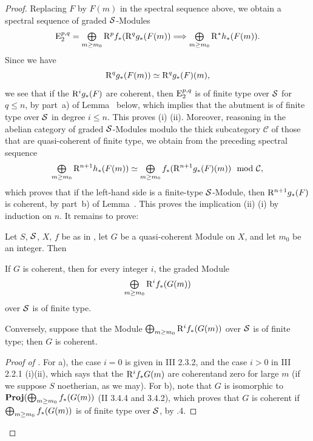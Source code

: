 \begin{proof}
Replacing $F$ by $F(m)$ in the spectral sequence above, we
obtain a spectral sequence of graded $\mathcal S$-Modules\pageoriginale
\[
\operatorname{E}_2^{p, q}= \mathop{\textstyle\bigoplus}\limits_{m\geq m_0} \mathrm R^pf_\ast(\mathrm R^qg_\ast(F(m)) \Longrightarrow \mathop{\textstyle\bigoplus}\limits_{m\geq m_0} \mathrm R^\ast h_\ast(F(m)).
\]
Since we have
\[
\mathrm R^qg_\ast(F(m)) \simeq \mathrm R^qg_\ast(F) (m),
\]
we see that if the $\mathrm R^ig_\ast(F)$ are coherent, then $\operatorname{E}_2^{p, q}$ is of finite type over $\mathcal S$ for $q\leq n$, by part~a) of Lemma~ below, which implies that the abutment is of finite type over $\mathcal S$ in degree $i\leq n$. This proves (i) \ALORS (ii). Moreover, reasoning in the abelian category of graded $\mathcal S$-Modules modulo the thick subcategory $\mathcal{C}$ of those that are quasi-coherent of finite type, we obtain from the preceding spectral sequence
\[
\mathop{\textstyle\bigoplus}\limits_{m\geq m_0} \mathrm R^{n+1} h_\ast(F(m)) \simeq \mathop{\textstyle\bigoplus}\limits_{m\geq m_0} f_\ast (\mathrm R^{n+1} g_\ast(F)(m)) \mod \mathcal{C},
\]
which proves that if the left-hand side is a finite-type $\mathcal S$-Module, then $\mathrm R^{n+1} g_\ast(F)$ is coherent, by part~b) of Lemma~. This proves the implication (ii) \ALORS (i) by induction on $n$. It remains to prove:

\begin{lemme} \label{XII.5.3} Let $S$, $\mathcal S$, $X$, $f$ be as in , let $G$ be a quasi-coherent Module on $X$, and let $m_0$ be an integer. Then
\begin{enumeratea}
\item
If $G$ is coherent, then for every integer $i$, the graded Module
\[
\mathop{\textstyle\bigoplus}\limits_{m\geq m_0} \mathrm R^i f_\ast(G(m))
\]
over $\mathcal S$ is of finite type.
\item
Conversely, suppose that the Module $\bigoplus_{m\geq m_0} \mathrm R^i f_\ast(G(m))$ over $\mathcal S$ is of finite type; then $G$ is coherent.
\end{enumeratea}
\end{lemme}

\begin{proof}[Proof of ]
For a), the case $i=0$ is given in \EGA III 2.3.2, and the case $i>0$ in \EGA III 2.2.1 (i)(ii), which says that the $ \mathrm R^i f_\ast G(m)$ are coherent\pageoriginale and zero for large $m$ (if we suppose $S$ noetherian, as we may). For b), note that $G$ is isomorphic to $\operatorname{\mathbf{Proj}} (\bigoplus_{m\geq m_0}f_\ast(G(m))$ (\EGA II 3.4.4 and 3.4.2), which proves that $G$ is coherent if $\bigoplus_{m\geq m_0}f_\ast(G(m))$ is of finite type over $\mathcal S$, by .4.
\skipqed
\end{proof}
\skipqed
\end{proof}

